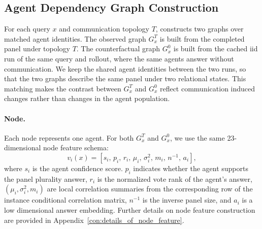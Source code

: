 

\subsection{Agent Dependency Graph Construction}

For each query $x$ and communication topology $T$, \methodname{} constructs two graphs over matched agent identities. 
The observed graph $G_x^T$ is built from the completed panel under topology $T$. 
The counterfactual graph $G_x^0$ is built from the cached iid run of the same query and rollout, where the same agents answer without communication. 
We keep the shared agent identities between the two runs, so that the two graphs describe the same panel under two relational states. 
This matching makes the contrast between $G_x^T$ and $G_x^0$ reflect communication induced changes rather than changes in the agent population.


\paragraph{Node.}
Each node represents one agent. 
For both $G_x^T$ and $G_x^0$, we use the same 23-dimensional node feature schema:
\begin{equation}
v_i(x)
=
[
s_i,\,
p_i,\,
r_i,\,
\mu_i,\,
\sigma_i^2,\,
m_i,\,
n^{-1},\,
a_i
],
\end{equation}
where $s_i$ is the agent confidence score.  $p_i$ indicates whether the agent supports the panel plurality answer, $r_i$ is the normalized vote rank of the agent's answer, $(\mu_i,\sigma_i^2,m_i)$ are local correlation summaries from the corresponding row of the instance conditional correlation matrix, $n^{-1}$ is the inverse panel size, and $a_i$ is a low dimensional answer embedding.  Further details on node feature construction are provided in Appendix~\ref{con:details_of_node_feature}.

